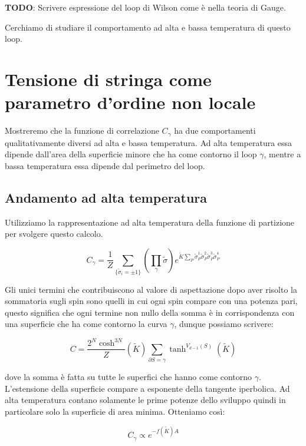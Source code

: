 \documentclass[12pt,a4paper]{article}
\begin{document}
\textbf{TODO}: Scrivere espressione del loop di Wilson come è nella teoria di Gauge.

Cerchiamo di studiare il comportamento ad alta e bassa temperatura di questo loop.

\section{Tensione di stringa come parametro d'ordine non locale}
Mostreremo che la funzione di correlazione $C_{\gamma}$ ha due comportamenti qualitativamente diversi ad alta e bassa temperatura. Ad alta temperatura essa dipende dall'area della superficie minore che ha come contorno il loop $\gamma$, mentre a bassa temperatura essa dipende dal perimetro del loop. 

\subsection{Andamento ad alta temperatura}
Utilizziamo la rappresentazione ad alta temperatura della funzione di partizione per svolgere questo calcolo.

\begin{equation}
C_{\gamma} = \frac{1}{Z} \sum_{ \lbrace \tilde{\sigma}_i = \pm 1 \rbrace } \left( \prod_{\gamma} \tilde{\sigma} \right)  e^{\tilde{K} \sum_{P} \tilde{\sigma}_P^1 \tilde{\sigma}_P^2 \tilde{\sigma}_P^3 \tilde{\sigma}_P^4}  
\end{equation}

Gli unici termini che contribuiscono al valore di aspettazione dopo aver risolto la sommatoria sugli spin sono quelli in cui ogni spin compare con una potenza pari, questo significa che ogni termine non nullo della somma è in corrispondenza con una superficie che ha come contorno la curva $\gamma$, dunque possiamo scrivere:

\begin{equation}
C = \frac{2^N \cosh^{3 N}}{Z}  \left( \tilde{K} \right) \sum_{\partial S = \gamma} \tanh  ^{V_{d-1}(S)} \left( \tilde{K} \right)
\end{equation}

dove la somma è fatta su tutte le superfici che hanno come contorno $\gamma$. L'estensione della superficie compare a esponente della tangente iperbolica. Ad alta temperatura contano solamente le prime potenze dello sviluppo quindi in particolare solo la superficie di area minima. Otteniamo così:

\begin{equation}
C_{\gamma} \propto e^{-f(\tilde{K}) A}
\end{equation}
\end{document}
